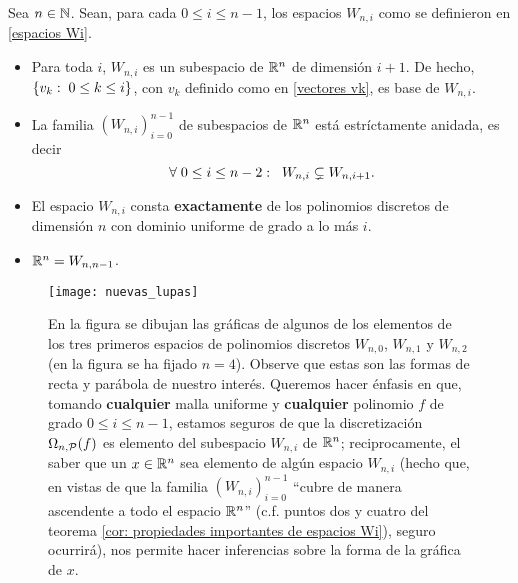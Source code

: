 \begin{teo}
\label{cor: propiedades importantes de espacios Wi}
Sea $n \in \mathbb{N}$. Sean, para cada $0 \leq i \leq n-1$,
los espacios $W_{n,i}$ como
se definieron en \eqref{espacios Wi}.
\begin{itemize}
\item Para toda $i$, $W_{n,i}$ es un subespacio
de $\mathbb{R}^{n}$ de dimensión $i+1$. De hecho, 
$\{v_{k}: \hspace{0.1cm} 0\leq k \leq i \}$, con
$v_{k}$ definido como en \eqref{vectores vk},
es base de $W_{n,i}$.

\item La familia $(W_{n,i})_{i=0}^{n-1}$ de subespacios
	de $\mathbb{R}^{n}$ está estríctamente anidada, es decir
	\begin{equation}
	\label{espacios Wi estan anidados}
	\forall \hspace{0.1cm}
	0 \leq i \leq n-2: \hspace{0.2cm}
	W_{n,i} \subsetneq W_{n,i+1}.
	\end{equation}

\item El espacio $W_{n,i}$ consta \textbf{exactamente}
de los polinomios discretos de dimensión $n$ con dominio uniforme
de grado a lo más $i$.

\item $\mathbb{R}^{n}= W_{n,n-1}$.
\end{itemize}
\end{teo}

\begin{figure}[H]
\centering\captionsetup{format = hang}
	\begin{measuredfigure}
		\texttt{[image: nuevas\_lupas]} 
		\caption{
	En la figura	
	se dibujan las gráficas de algunos de los elementos
	de los tres primeros espacios de polinomios discretos
	$W_{n,0}$, $W_{n,1}$ y $W_{n,2}$
	(en la figura se ha fijado $n=4$).
    Observe que estas son
	las formas de recta y parábola de
	nuestro interés. 
	Queremos hacer énfasis en que, tomando
	\textbf{cualquier} malla uniforme y \textbf{cualquier} 
	polinomio $f$
	de grado $0 \leq i \leq n-1$, estamos seguros de que
	la discretización $\Omega_{n, \mathcal{P}}(f)$ es elemento
	del subespacio $W_{n,i}$ de $\mathbb{R}^{n}$; reciprocamente, el 
	saber que un $x \in \mathbb{R}^{n}$ sea elemento 
	de algún espacio $W_{n,i}$ (hecho
	que, en vistas de que la familia $(W_{n,i})_{i=0}^{n-1}$
	``cubre de manera ascendente a todo el espacio $\mathbb{R}^{n}$''
	(c.f. puntos dos y cuatro del teorema 
	\ref{cor: propiedades importantes de espacios Wi}), seguro 
	ocurrirá), nos permite hacer inferencias sobre la forma 
	de la gráfica de $x$.}
 	\end{measuredfigure}
 \end{figure}





